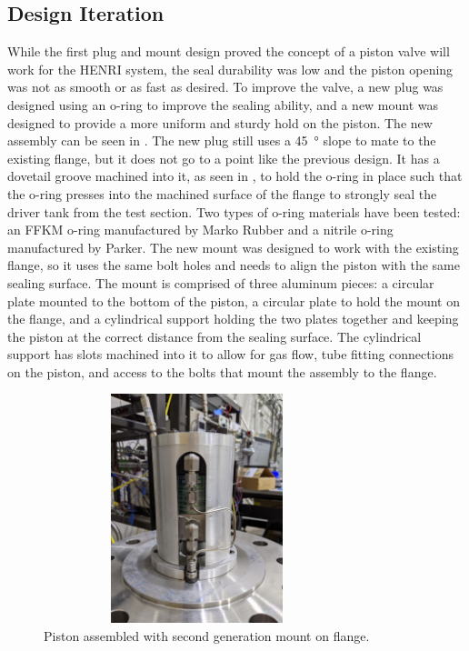 \subsection{Design Iteration} \label{s:iteration}
While the first plug and mount design proved the concept of a piston valve will work for the HENRI system, the seal durability was low and the piston opening was not as smooth or as fast as desired. To improve the valve, a new plug was designed using an o-ring to improve the sealing ability, and a new mount was designed to provide a more uniform and sturdy hold on the piston. The new assembly can be seen in . The new plug still uses a \SI{45}{\degree} slope to mate to the existing flange, but it does not go to a point like the previous design. It has a dovetail groove machined into it, as seen in , to hold the o-ring in place such that the o-ring presses into the machined surface of the flange to strongly seal the driver tank from the test section. Two types of o-ring materials have been tested: an FFKM o-ring manufactured by Marko Rubber and a nitrile o-ring manufactured by Parker. The new mount was designed to work with the existing flange, so it uses the same bolt holes and needs to align the piston with the same sealing surface. The mount is comprised of three aluminum pieces: a circular plate mounted to the bottom of the piston, a circular plate to hold the mount on the flange, and a cylindrical support holding the two plates together and keeping the piston at the correct distance from the sealing surface. The cylindrical support has slots machined into it to allow for gas flow, tube fitting connections on the piston, and access to the bolts that mount the assembly to the flange.


%
\begin{figure}[htbp]
    \vspace{16pt}
    \centering
    \includegraphics[height=2.625in, width=3.5in,angle=270]{experiment/photos/Piston_Assembly.jpg} %
    \caption{Piston assembled with second generation mount on flange.}
    \label{fig:piston assembly}
    \vspace{16pt}
\end{figure}
%


